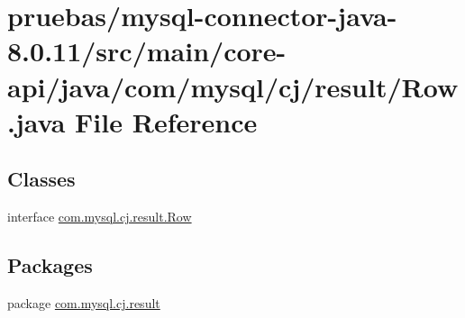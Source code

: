 \hypertarget{core-api_2java_2com_2mysql_2cj_2result_2_row_8java}{}\section{pruebas/mysql-\/connector-\/java-\/8.0.11/src/main/core-\/api/java/com/mysql/cj/result/\+Row.java File Reference}
\label{core-api_2java_2com_2mysql_2cj_2result_2_row_8java}
\subsection*{Classes}
\begin{DoxyCompactItemize}
\item 
interface \mbox{\hyperlink{interfacecom_1_1mysql_1_1cj_1_1result_1_1_row}{com.\+mysql.\+cj.\+result.\+Row}}
\end{DoxyCompactItemize}
\subsection*{Packages}
\begin{DoxyCompactItemize}
\item 
package \mbox{\hyperlink{namespacecom_1_1mysql_1_1cj_1_1result}{com.\+mysql.\+cj.\+result}}
\end{DoxyCompactItemize}
